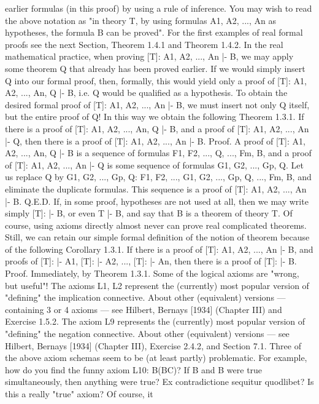 earlier formulas (in this proof) by using a rule of inference. You may wish to read the above notation as
"in theory T, by using formulas A1, A2, ..., An as hypotheses, the formula B can be proved".
For the first examples of real formal proofs see the next Section, Theorem 1.4.1 and Theorem 1.4.2.
In the real mathematical practice, when proving [T]: A1, A2, ..., An |- B, we may apply some theorem Q
that already has been proved earlier. If we would simply insert Q into our formal proof, then, formally,
this would yield only a proof of [T]: A1, A2, ..., An, Q |- B, i.e. Q would be qualified as a hypothesis. To
obtain the desired formal proof of [T]: A1, A2, ..., An |- B, we must insert not only Q itself, but the entire
proof of Q! In this way we obtain the following
Theorem 1.3.1. If there is a proof of [T]: A1, A2, ..., An, Q |- B, and a proof of [T]: A1, A2, ..., An |- Q,
then there is a proof of [T]: A1, A2, ..., An |- B.
Proof. A proof of [T]: A1, A2, ..., An, Q |- B is a sequence of formulas F1, F2, ..., Q, ..., Fm, B, and a proof
of [T]: A1, A2, ..., An |- Q is some sequence of formulas G1, G2, ..., Gp, Q. Let us replace Q by G1, G2, ...,
Gp, Q:
F1, F2, ..., G1, G2, ..., Gp, Q, ..., Fm, B,
and eliminate the duplicate formulas. This sequence is a proof of [T]: A1, A2, ..., An |- B. Q.E.D.
If, in some proof, hypotheses are not used at all, then we may write simply [T]: |- B, or even T |- B, and
say that B is a theorem of theory T. Of course, using axioms directly almost never can prove real
complicated theorems. Still, we can retain our simple formal definition of the notion of theorem because
of the following
Corollary 1.3.1. If there is a proof of [T]: A1, A2, ..., An |- B, and proofs of [T]: |- A1, [T]: |- A2, ..., [T]: |-
An, then there is a proof of [T]: |- B.
Proof. Immediately, by Theorem 1.3.1.
Some of the logical axioms are "wrong, but useful"!
The axioms L1, L2 represent the (currently) most popular version of "defining" the implication
connective. About other (equivalent) versions --- containing 3 or 4 axioms --- see Hilbert, Bernays [1934]
(Chapter III) and Exercise 1.5.2.
The axiom L9 represents the (currently) most popular version of "defining" the negation connective.
About other (equivalent) versions --- see Hilbert, Bernays [1934] (Chapter III), Exercise 2.4.2, and Section
7.1.
Three of the above axiom schemas seem to be (at least partly) problematic.
For example, how do you find the funny axiom L10: \neg B\IMPLIES (B\IMPLIES C)? If \neg B and B were true simultaneously,
then anything were true? Ex contradictione sequitur quodlibet? Is this a really "true" axiom? Of course, it
